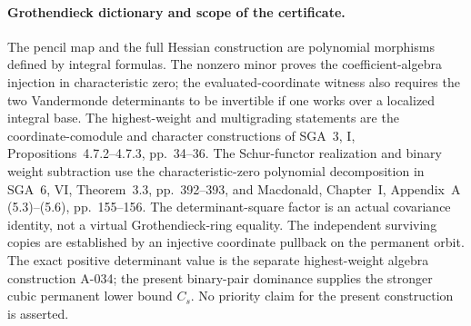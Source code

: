 \paragraph{Grothendieck dictionary and scope of the certificate.}
The pencil map and the full Hessian construction are
polynomial morphisms defined by integral formulas.
The nonzero minor proves the coefficient-algebra injection
in characteristic zero; the evaluated-coordinate witness
also requires the two Vandermonde determinants to be
invertible if one works over a localized integral base.
The highest-weight and multigrading statements are the
coordinate-comodule and character constructions of
SGA~3, I, Propositions~4.7.2--4.7.3, pp.~34--36.
The Schur-functor realization and binary weight subtraction
use the characteristic-zero polynomial decomposition
in SGA~6, VI, Theorem~3.3, pp.~392--393, and Macdonald,
Chapter~I, Appendix~A (5.3)--(5.6), pp.~155--156.
The determinant-square factor is an actual covariance
identity, not a virtual Grothendieck-ring equality.
The independent surviving copies are established by
an injective coordinate pullback on the permanent orbit.
The exact positive determinant value is the separate
highest-weight algebra construction A-034; the present
binary-pair dominance supplies the stronger cubic
permanent lower bound \(C_s\).
No priority claim for the present construction is asserted.
